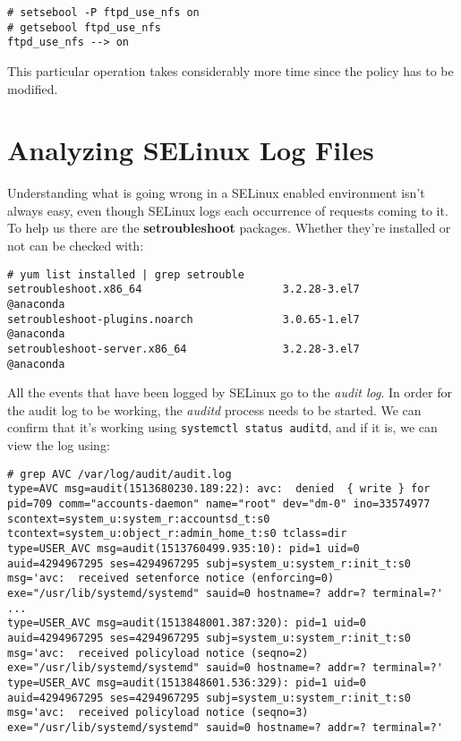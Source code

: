 \vspace{-15pt}
\begin{verbatim}
# setsebool -P ftpd_use_nfs on
# getsebool ftpd_use_nfs
ftpd_use_nfs --> on
\end{verbatim}
\vspace{-10pt}

\noindent
This particular operation takes considerably more time since the policy has to be modified. 

\section{Analyzing SELinux Log Files}
Understanding what is going wrong in a SELinux enabled environment isn't always easy, even though SELinux logs each occurrence of requests coming to it. To help us there are the \textbf{setroubleshoot} packages. Whether they're installed or not can be checked with:

\vspace{-15pt}
\begin{verbatim}
# yum list installed | grep setrouble
setroubleshoot.x86_64                      3.2.28-3.el7                @anaconda
setroubleshoot-plugins.noarch              3.0.65-1.el7                @anaconda
setroubleshoot-server.x86_64               3.2.28-3.el7                @anaconda
\end{verbatim}
\vspace{-10pt}

\noindent
All the events that have been logged by SELinux go to the \textit{audit log}. In order for the audit log to be working, the \textit{auditd} process needs to be started. We can confirm that it's working using \verb|systemctl status auditd|, and if it is, we can view the log using: 

\vspace{-15pt}
\begin{verbatim}
# grep AVC /var/log/audit/audit.log
type=AVC msg=audit(1513680230.189:22): avc:  denied  { write } for  pid=709 comm="accounts-daemon" name="root" dev="dm-0" ino=33574977 scontext=system_u:system_r:accountsd_t:s0 tcontext=system_u:object_r:admin_home_t:s0 tclass=dir
type=USER_AVC msg=audit(1513760499.935:10): pid=1 uid=0 auid=4294967295 ses=4294967295 subj=system_u:system_r:init_t:s0 msg='avc:  received setenforce notice (enforcing=0)  exe="/usr/lib/systemd/systemd" sauid=0 hostname=? addr=? terminal=?'
...
type=USER_AVC msg=audit(1513848001.387:320): pid=1 uid=0 auid=4294967295 ses=4294967295 subj=system_u:system_r:init_t:s0 msg='avc:  received policyload notice (seqno=2)  exe="/usr/lib/systemd/systemd" sauid=0 hostname=? addr=? terminal=?'
type=USER_AVC msg=audit(1513848601.536:329): pid=1 uid=0 auid=4294967295 ses=4294967295 subj=system_u:system_r:init_t:s0 msg='avc:  received policyload notice (seqno=3)  exe="/usr/lib/systemd/systemd" sauid=0 hostname=? addr=? terminal=?'
\end{verbatim}
\vspace{-10pt}


